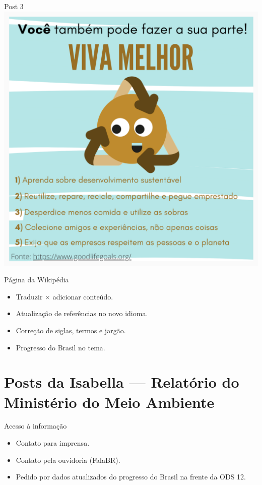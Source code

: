 \documentclass{beamer}
\begin{document}
	\begin{frame}{Post 3}
		\centering
		\includegraphics[width=0.7\linewidth]{Post 3/7.png}
	\end{frame}

	\begin{frame}{Página da Wikipédia}
		\begin{itemize}
			\item Traduzir $ \times $ adicionar conteúdo.
			\item Atualização de referências no novo idioma.
			\item Correção de siglas, termos e jargão.
			\item Progresso do Brasil no tema.
		\end{itemize}
	\end{frame}

	\section{Posts da Isabella --- Relatório do Ministério do Meio Ambiente}

	\begin{frame}{Acesso à informação}
		\begin{itemize}
			\item Contato para imprensa.
			\item Contato pela ouvidoria (FalaBR).
			\item Pedido por dados atualizados do progresso do Brasil na frente da ODS 12.
		\end{itemize}
	\end{frame}
\end{document}
